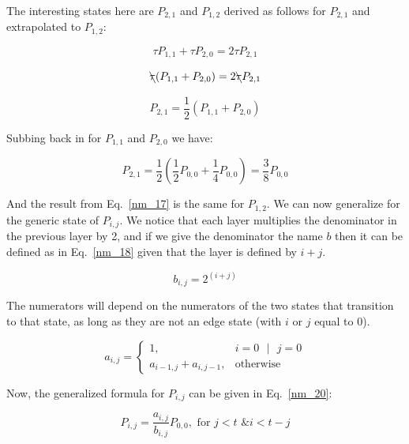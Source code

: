 \documentclass[conference]{IEEEtran}
\begin{document}
The interesting states here are $P_{2,1}$ and $P_{1, 2}$ derived as follows 
for $P_{2,1}$ and extrapolated to $P_{1,2}$:

\begin{equation}
  \tau P_{1,1} + \tau P_{2,0} = 2\tau P_{2,1} \label{nm_14}
\end{equation}

\begin{equation}
  \bcancel{\tau} (P_{1,1} + P_{2,0}) = 2\bcancel{\tau} P_{2,1} \label{nm_15}
\end{equation}

\begin{equation}
  P_{2,1} = \frac{1}{2}(P_{1,1} + P_{2,0})\label{nm_16}
\end{equation}

Subbing back in for $P_{1,1}$ and $P_{2,0}$ we have:

\begin{equation}
  P_{2,1} = \frac{1}{2}(\frac{1}{2}P_{0,0} + \frac{1}{4}P_{0,0}) = \frac{3}{8}P_{0,0}\label{nm_17}
\end{equation}

And the result from Eq.~\ref{nm_17} is the same for $P_{1,2}$. We can now generalize
for the generic state of $P_{i,j}$. We notice that each layer multiplies the denominator in 
the previous layer by 2, and if we give the denominator the name $b$ then it can be defined
as in Eq.~\ref{nm_18} given that the layer is defined by $i+j$. 

\begin{equation}
  b_{i,j} = 2^{(i+j)}\label{nm_18}
\end{equation}

The numerators will depend on the numerators of the two states that transition to that
state, as long as they are not an edge state (with $i$ or $j$ equal to 0). 

\begin{equation}
  a_{i,j} =
    \begin{cases}
      1,                            & i = 0 \text{ }|\text{ } j = 0 \\
      a_{i-1,j} + a_{i,j-1},  & \text{otherwise}
    \end{cases}
    \label{nm_19}
\end{equation}

Now, the generalized formula for $P_{i,j}$ can be given in Eq.~\ref{nm_20}:

\begin{equation}
  P_{i,j} = \frac{a_{i,j}}{b_{i,j}}P_{0,0}, \text{  for } j < t \text{ \& } i < t-j\label{nm_20}
\end{equation}
\end{document}
